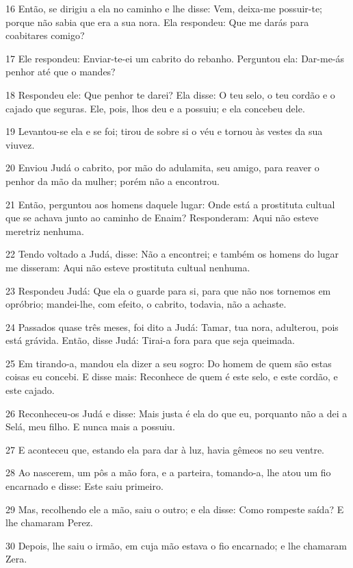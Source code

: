 \par 16 Então, se dirigiu a ela no caminho e lhe disse: Vem, deixa-me possuir-te; porque não sabia que era a sua nora. Ela respondeu: Que me darás para coabitares comigo?
\par 17 Ele respondeu: Enviar-te-ei um cabrito do rebanho. Perguntou ela: Dar-me-ás penhor até que o mandes?
\par 18 Respondeu ele: Que penhor te darei? Ela disse: O teu selo, o teu cordão e o cajado que seguras. Ele, pois, lhos deu e a possuiu; e ela concebeu dele.
\par 19 Levantou-se ela e se foi; tirou de sobre si o véu e tornou às vestes da sua viuvez.
\par 20 Enviou Judá o cabrito, por mão do adulamita, seu amigo, para reaver o penhor da mão da mulher; porém não a encontrou.
\par 21 Então, perguntou aos homens daquele lugar: Onde está a prostituta cultual que se achava junto ao caminho de Enaim? Responderam: Aqui não esteve meretriz nenhuma.
\par 22 Tendo voltado a Judá, disse: Não a encontrei; e também os homens do lugar me disseram: Aqui não esteve prostituta cultual nenhuma.
\par 23 Respondeu Judá: Que ela o guarde para si, para que não nos tornemos em opróbrio; mandei-lhe, com efeito, o cabrito, todavia, não a achaste.
\par 24 Passados quase três meses, foi dito a Judá: Tamar, tua nora, adulterou, pois está grávida. Então, disse Judá: Tirai-a fora para que seja queimada.
\par 25 Em tirando-a, mandou ela dizer a seu sogro: Do homem de quem são estas coisas eu concebi. E disse mais: Reconhece de quem é este selo, e este cordão, e este cajado.
\par 26 Reconheceu-os Judá e disse: Mais justa é ela do que eu, porquanto não a dei a Selá, meu filho. E nunca mais a possuiu.
\par 27 E aconteceu que, estando ela para dar à luz, havia gêmeos no seu ventre.
\par 28 Ao nascerem, um pôs a mão fora, e a parteira, tomando-a, lhe atou um fio encarnado e disse: Este saiu primeiro.
\par 29 Mas, recolhendo ele a mão, saiu o outro; e ela disse: Como rompeste saída? E lhe chamaram Perez.
\par 30 Depois, lhe saiu o irmão, em cuja mão estava o fio encarnado; e lhe chamaram Zera.

